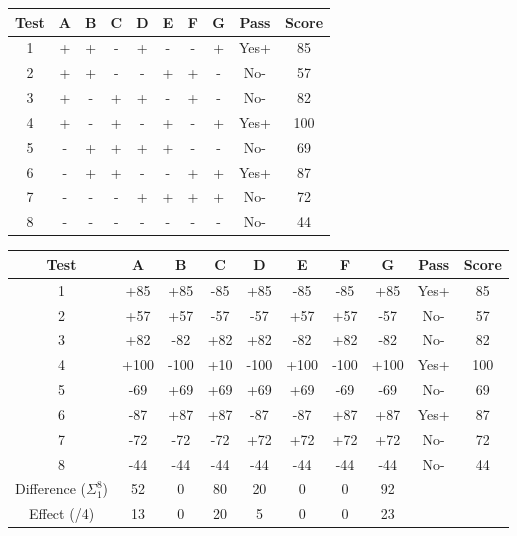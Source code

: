 \documentclass[]{article}
\begin{document}
\begin{table}[H]
	\begin{center}
\begin{tabular}{|c|c|c|c|c|c|c|c|c|c|}
	\hline Test & A & B & C & D & E & F & G & Pass & Score \\
	\hline 1 & + & + & - & + & - & - & + & Yes+& 85 \\
	\hline 2 & + & + & - & - & + & + & - & No- & 57 \\
	\hline 3 & + & - & + & + & - & + & - & No- & 82 \\
	\hline 4 & + & - & + & - & + & - & + & Yes+& 100 \\
	\hline 5 & - & + & + & + & + & - & - & No- & 69 \\
	\hline 6 & - & + & + & - & - & + & + & Yes+& 87 \\
	\hline 7 & - & - & - & + & + & + & + & No- & 72 \\
	\hline 8 & - & - & - & - & - & - & - & No- & 44 \\
	\hline
\end{tabular}
\end{center}
\end{table}


\begin{table}[H]
	\begin{center}
		\begin{tabular}{|c|c|c|c|c|c|c|c|c|c|}
			\hline Test & A & B & C & D & E & F & G & Pass & Score \\
			\hline 1 & +85 & +85 & -85 & +85 & -85 & -85 & +85 & Yes+& 85 \\
			\hline 2 & +57 & +57 & -57 & -57 & +57 & +57 & -57 & No- & 57 \\
			\hline 3 & +82 & -82 & +82 & +82 & -82 & +82 & -82 & No- & 82 \\
			\hline 4 & +100 & -100 & +10 & -100 & +100 & -100 & +100 & Yes+& 100 \\
			\hline 5 & -69 & +69 & +69 & +69 & +69 & -69 & -69 & No- & 69 \\
			\hline 6 & -87 & +87 & +87 & -87 & -87 & +87 & +87 & Yes+& 87 \\
			\hline 7 & -72 & -72 & -72 & +72 & +72& +72 & +72 & No- & 72 \\
			\hline 8 & -44 & -44 & -44 & -44 & -44 & -44 & -44 & No- & 44 \\
			\hline 
			\hline Difference ($\Sigma_1^8$) & 52 & 0 & 80 & 20 & 0 & 0 & 92 &  &  \\
			\hline Effect (/4) & 13 & 0 & 20 & 5 & 0 & 0 & 23 & & \\
			\hline
		\end{tabular}
	\end{center}
\end{table}
\end{document}
